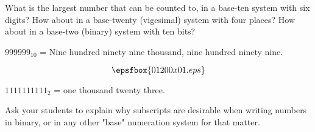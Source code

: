 

What is the largest number that can be counted to, in a base-ten system with six digits?  How about in a base-twenty (vigesimal) system with four places?  How about in a base-two (binary) system with ten bits?







$999999_{10}$ = Nine hundred ninety nine thousand, nine hundred ninety nine.

\vskip 10pt

$$\epsfbox{01200x01.eps}$$

\vskip 10pt

$1111111111_2$ = one thousand twenty three.







Ask your students to explain why subscripts are desirable when writing numbers in binary, or in any other "base" numeration system for that matter.





